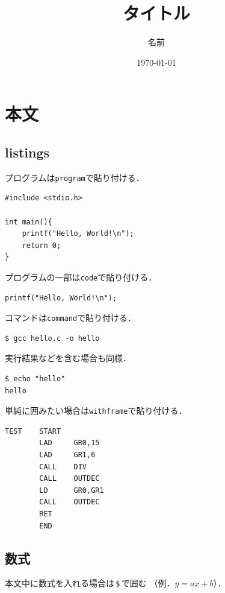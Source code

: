 \documentclass[11pt]{ltjsarticle}
\newcommand{\mytitle}{タイトル}
\newcommand{\myname}{名前}
\newcommand{\vsc}{\vspace{5pt}}
\newcommand{\vsp}{\vspace{10pt}}
\begin{document}
\title{\mytitle}
\author{\myname}
\date{\today}
\maketitle
\tableofcontents

\newpage
\section{本文}
\subsection{listings}
プログラムは\verb|program|で貼り付ける．

\begin{lstlisting}[style=program,caption=hello.c]
#include <stdio.h>

int main(){
    printf("Hello, World!\n");
    return 0;
}
\end{lstlisting}
\vsp

プログラムの一部は\verb|code|で貼り付ける．

\vsc
\begin{lstlisting}[style=code]
printf("Hello, World!\n");
\end{lstlisting}

コマンドは\verb|command|で貼り付ける．

\vsc
\begin{lstlisting}[style=command]
$ gcc hello.c -o hello
\end{lstlisting}

実行結果などを含む場合も同様．

\vsc
\begin{lstlisting}[style=command]
$ echo "hello"
hello
\end{lstlisting}

単純に囲みたい場合は\verb|withframe|で貼り付ける．

\vsc
\begin{lstlisting}[style=withframe]
TEST    START
        LAD     GR0,15
        LAD     GR1,6
        CALL    DIV
        CALL    OUTDEC
        LD      GR0,GR1
        CALL    OUTDEC
        RET
        END
\end{lstlisting}

\newpage
\subsection{数式}
本文中に数式を入れる場合は\,\verb|$|\,で囲む
（例．$y=ax+b$）．
\end{document}
